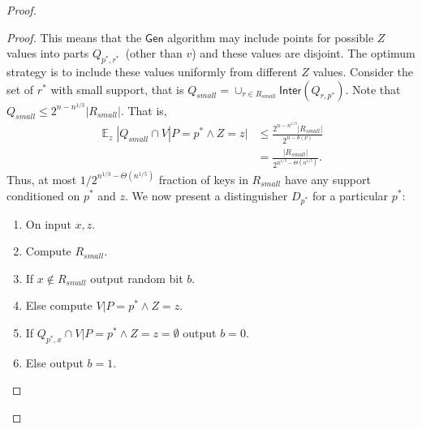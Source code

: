 \documentclass[11pt]{article}
\DeclareMathOperator*{\expe}{\mathbb{E}}
\newcommand{\class}[1]{{\ensuremath{\mathsf{#1}}}}
\newcommand{\gen}{\ensuremath{\class{Gen}}\xspace}
\newcommand{\inter}{\ensuremath{\class{Inter}}\xspace}
\begin{document}
\begin{proof}
\begin{proof}
This means that the $\gen$ algorithm may include points for possible $Z$ values into parts $Q_{p^*, r^*}$~(other than $v$) and these values are disjoint.  The optimum strategy is to include these values uniformly from different $Z$ values.  Consider the set of $r^*$ with small support, that is $Q_{small} = \cup_{r\in R_{small}} \inter(Q_{r, p^*})$.  Note that $Q_{small} \le 2^{n-n^{1/3}}|R_{small}|$.
That is, 
\begin{align*}
\expe_z |Q_{small} \cap V | P=p^* \wedge Z=z | &\le \frac{2^{n-n^{1/3}}|R_{small}|}{2^{n - \theta(\nu)}}\\
&=\frac{|R_{small}|}{2^{n^{1/3}-\Theta(n^{1/5})}}.
\end{align*}
Thus, at most $1/2^{n^{1/3}- \Theta(n^{1/5})}$ fraction of keys in $R_{small}$ have any support  conditioned on $p^*$ and $z$.  We now present a distinguisher $D_{p^*}$ for a particular $p^*$:
\begin{enumerate}
\item On input $x, z$.
\item Compute $R_{small}$.  
\item If $x\not \in R_{small}$ output random bit $b$.
\item Else compute $V|P=p^* \wedge Z=z$. 
\item If $Q_{p^*, x} \cap V|P=p^* \wedge Z=z =\emptyset$ output $b=0$.
\item Else output $b=1$.
\end{enumerate}


\end{proof}
\end{proof}
\end{document}
